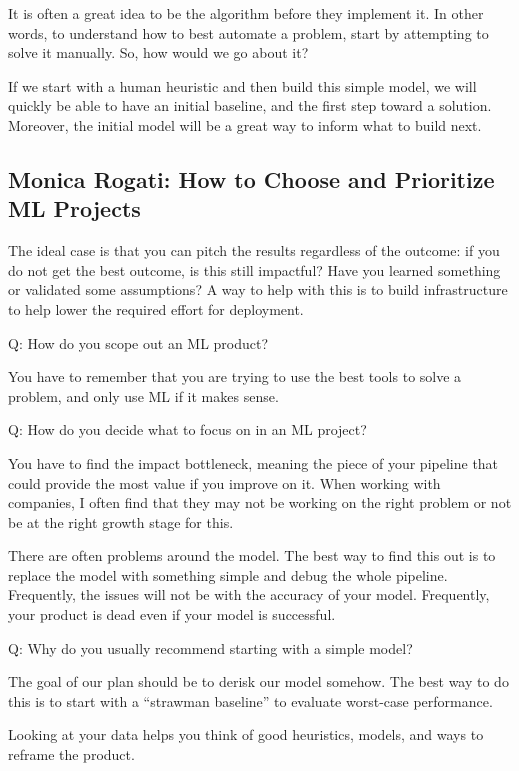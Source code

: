 It is often a great idea to be the algorithm before they
implement it. In other words, to understand how to best
automate a problem, start by attempting to solve it manually.
So, how would we go about it?

If we start with a human heuristic and then build this simple
model, we will quickly be able to have an initial baseline,
and the first step toward a solution. Moreover, the
initial model will be a great way to inform what to build next.


\subsection*{Monica Rogati: How to Choose and Prioritize ML Projects}
The ideal case is that you can pitch the results regardless of the outcome: if you do
not get the best outcome, is this still impactful? Have you learned something or validated
some assumptions? A way to help with this is to build infrastructure to help
lower the required effort for deployment.

Q: How do you scope out an ML product?

You have to remember that you are trying to use the best tools to
solve a problem, and only use ML if it makes sense.


Q: How do you decide what to focus on in an ML project?

You have to find the impact bottleneck, meaning the piece of your pipeline that
could provide the most value if you improve on it. When working with companies, I
often find that they may not be working on the right problem or not be at the right
growth stage for this.

There are often problems around the model. The best way to find this out is to
replace the model with something simple and debug the whole pipeline. Frequently,
the issues will not be with the accuracy of your model. Frequently, your product is
dead even if your model is successful.


Q: Why do you usually recommend starting with a simple model?

The goal of our plan should be to derisk our model somehow. The best way to do
this is to start with a “strawman baseline” to evaluate worst-case performance.

Looking at your data helps you think of good heuristics, models, and ways to reframe
the product.

